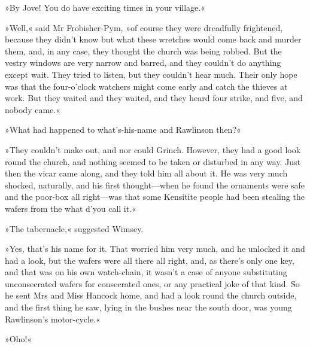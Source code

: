 »By Jove! You do have exciting times in your village.«

»Well,« said Mr Frobisher-Pym, »of course they were dreadfully frightened, because they didn't know but what these wretches would come back and murder them, and, in any case, they thought the church was being robbed. But the vestry windows are very narrow and barred, and they couldn't do anything except wait. They tried to listen, but they couldn't hear much. Their only hope was that the four-o'clock watchers might come early and catch the thieves at work. But they waited and they waited, and they heard four strike, and five, and nobody came.«

»What had happened to what's-his-name and Rawlinson then?«

»They couldn't make out, and nor could Grinch. However, they had a good look round the church, and nothing seemed to be taken or disturbed in any way. Just then the vicar came along, and they told him all about it. He was very much shocked, naturally, and his first thought—when he found the ornaments were safe and the poor-box all right—was that some Kensitite people had been stealing the wafers from the what d'you call it.«

»The tabernacle,« suggested Wimsey.

»Yes, that's his name for it. That worried him very much, and he unlocked it and had a look, but the wafers were all there all right, and, as there's only one key, and that was on his own watch-chain, it wasn't a case of anyone substituting unconsecrated wafers for consecrated ones, or any practical joke of that kind. So he sent Mrs and Miss Hancock home, and had a look round the church outside, and the first thing he saw, lying in the bushes near the south door, was young Rawlinson's motor-cycle.«

»Oho!«


